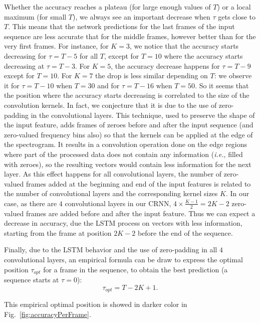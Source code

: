 Whether the accuracy reaches a plateau (for large enough values of $T$) or a local maximum (for small $T$), we always see an important decrease when $\tau$ gets close to $T$. This means that the network predictions for the last frames of the input sequence are less accurate that for the middle frames, however better than for the very first frames. For instance, for $K=3$, we notice that the accuracy starts decreasing for $\tau=T-5$ for all $T$, except for $T=10$ where the accuracy starts decreasing at $\tau=T-3$. For $K=5$, the accuracy decrease happens for $\tau=T-9$ except for $T=10$. For $K=7$ the drop is less similar depending on $T$: we observe it for $\tau=T-10$ when $T=30$ and for $\tau=T-16$ when $T=50$. So it seems that the position where the accuracy starts decreasing is correlated to the size of the convolution kernels. In fact, we conjecture that it is due to the use of zero-padding in the convolutional layers. This technique, used to preserve the shape of the input feature, adds frames of zeroes before and after the input sequence (and zero-valued frequency bins also) so that the kernels can be applied at the edge of the spectrogram. It results in a convolution operation done on the edge regions where part of the processed data does not contain any information (\emph{i.e.}, filled with zeroes), so the resulting vectors would contain less information for the next layer. As this effect happens for all convolutional layers, the number of zero-valued frames added at the beginning and end of the input features is related to the number of convolutional layers and the corresponding kernel sizes $K$. In our case, as there are $4$ convolutional layers in our CRNN, $4 \times \frac{K-1}{2} = 2K-2$ zero-valued frames are added before and after the input feature. Thus we can expect a decrease in accuracy, due the LSTM process on vectors with less information, starting from the frame at position $2K-2$ before the end of the sequence.

Finally, due to the LSTM behavior and the use of zero-padding in all $4$ convolutional layers, an empirical formula can be draw to express the optimal position $\tau_{opt}$ for a frame in the sequence, to obtain the best prediction (a sequence starts at $\tau=0$):
\begin{equation}
    \tau_{opt} = T-2K+1.
\end{equation}

This empirical optimal position is showed in darker color in Fig.~\ref{fig:accuracyPerFrame}.

